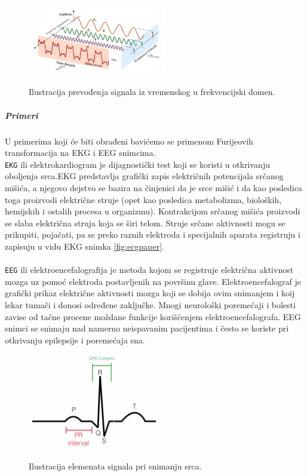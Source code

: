\documentclass[a4paper]{article}
\begin{document}
\begin{figure}[t]
\includegraphics[width=6cm]{Pictures/fourier.png}
\centering
\label{fig:fourier}
\caption{Ilustracija prevođenja signala iz vremenskog u frekvencijski domen.}
\end{figure}


\subparagraph{Primeri} U primerima koji će biti obrađeni bavićemo se primenom Furijeovih transformacija na EKG i EEG snimcima. \\

\texttt{EKG} ili elektrokardiogram je dijagnostički test koji se koristi u otkrivanju oboljenja srca.EKG predstavlja grafički zapis električnih potencijala srčanog mišića, a njegovo dejstvo se bazira na činjenici da je srce mišić i da kao posledica toga proizvodi električne struje (opet kao posledica metabolizma, bioloških, hemijskih i ostalih procesa u organizmu). Kontrakcijom srčanog mišića proizvodi se slaba električna struja koja se širi telom. Struje srčane aktivnosti mogu se prikupiti, pojačati, pa se preko raznih elektroda i specijalnih aparata registruju i zapisuju u vidu EKG snimka \ref{fig:ecgpaper}.\\\\
\texttt{EEG} ili elektroencefalografija je metoda kojom se registruje električna aktivnost mozga uz pomoć elektroda postavljenih na površinu glave. Elektroencefalograf je grafički prikaz električne aktivnosti mozga koji se dobija ovim snimanjem i koij lekar tumači i donosi određene zaključke. Mnogi neurološki poremećaji i bolesti zavise od tačne procene moždane funkcije korišćenjem elektroencefalografa. EEG snimci se snimaju nad namerno neispavanim pacijentima i često se koriste pri otkrivanju epilepsije i poremećaja sna.

\begin{figure}[t]
\includegraphics[width=6cm]{Pictures/Hsignal.png}
\centering
\label{fig:hsignal}
\caption{Ilustracija elemenata signala pri snimanju srca.}
\end{figure}
\end{document}
